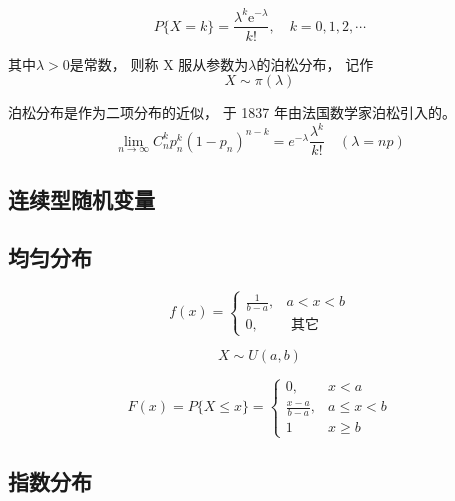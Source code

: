 \begin{equation}
{P}\{{X}={k}\}=\frac{\lambda^{k} \mathrm{e}^{-\lambda}}{{k} !}, \quad {k}={0}, {1}, {2}, \cdots
\end{equation}

其中$\lambda > 0$是常数， 则称 X 服从参数为$\lambda$的泊松分布， 记作
\begin{equation} X \sim \pi(\lambda) \end{equation}


\begin{theorem}[泊松定理]
    \label{thm:Poission}
泊松分布是作为二项分布的近似， 于 1837 年由法国数学家泊松引入的。
\begin{equation}
\lim _{n \rightarrow \infty} C_{n}^{k} p_{n}^{k}\left(1-p_{n}\right)^{n-k}=e^{-\lambda} \frac{\lambda^{k}}{k !}\quad (\lambda = np)
\end{equation}
\end{theorem}

\subsection{连续型随机变量}

\subsection{均匀分布}

\begin{equation}
f(x)=\left\{\begin{array}{cc}
\frac{1}{b-a}, & a<x<b \\
0, & \text { 其它 }
\end{array}\right.
\end{equation}

\begin{equation} X \sim U(a,b) \end{equation}

\begin{equation}
F(x)=P\{X \leq x\}=\left\{\begin{array}{ll}
0, & x<a \\
\frac{x-a}{b-a}, & a \leq x<b \\
1 & x \geq b
\end{array}\right.
\end{equation}

\subsection{指数分布}

